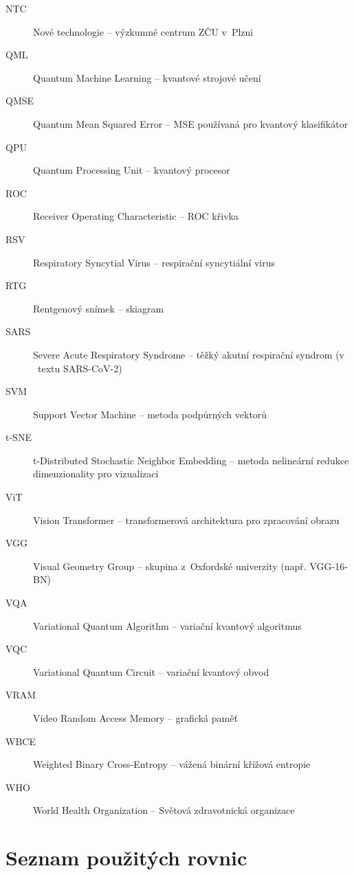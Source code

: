 \documentclass[12pt, a4paper]{report}
\begin{document}
\begin{description}
  \item[NTC] Nové technologie – výzkumné centrum ZČU v~Plzni
  \item[QML] Quantum Machine Learning – kvantové strojové učení
  \item[QMSE] Quantum Mean Squared Error – MSE používaná pro kvantový klasifikátor
  \item[QPU] Quantum Processing Unit – kvantový procesor
  \item[ROC] Receiver Operating Characteristic – ROC křivka
  \item[RSV] Respiratory Syncytial Virus – respirační syncytiální virus
  \item[RTG] Rentgenový snímek – skiagram
  \item[SARS] Severe Acute Respiratory Syndrome – těžký akutní respirační syndrom (v ~textu SARS-CoV-2)
  \item[SVM] Support Vector Machine – metoda podpůrných vektorů
  \item[t-SNE] t-Distributed Stochastic Neighbor Embedding – metoda nelineární redukce dimenzionality pro vizualizaci
  \item[ViT] Vision Transformer – transformerová architektura pro zpracování obrazu
  \item[VGG] Visual Geometry Group – skupina z~Oxfordské univerzity (např. VGG-16-BN)
  \item[VQA] Variational Quantum Algorithm – variační kvantový algoritmus
  \item[VQC] Variational Quantum Circuit – variační kvantový obvod
  \item[VRAM] Video Random Access Memory – grafická paměť
  \item[WBCE] Weighted Binary Cross-Entropy – vážená binární křížová entropie
  \item[WHO] World Health Organization – Světová zdravotnická organizace
\end{description}

\chapter*{Seznam použitých rovnic}
\listofmyequations
\end{document}
